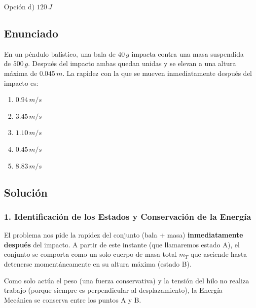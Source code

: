 \documentclass[12pt, a4paper]{article}
\begin{document}
\begin{tcolorbox}[colback=green!5!white, colframe=green!50!black, title=Respuesta Final]
\centering Opción d) $120 \, \si{J}$
\end{tcolorbox}

\newpage

\subsection*{Enunciado}
En un péndulo balístico, una bala de $40 \, \si{g}$ impacta contra una masa suspendida de $500 \, \si{g}$. Después del impacto ambas quedan unidas y se elevan a una altura máxima de $0.045 \, \si{m}$. La rapidez con la que se mueven inmediatamente después del impacto es:
\begin{enumerate}[label=\alph*)]
    \item $0.94 \, \si{m/s}$
    \item $3.45 \, \si{m/s}$
    \item $1.10 \, \si{m/s}$
    \item $0.45 \, \si{m/s}$
    \item $8.83 \, \si{m/s}$
\end{enumerate}

\subsection*{Solución}

\subsubsection*{1. Identificación de los Estados y Conservación de la Energía}
El problema nos pide la rapidez del conjunto (bala + masa) \textbf{inmediatamente después} del impacto. A partir de este instante (que llamaremos estado A), el conjunto se comporta como un solo cuerpo de masa total $m_T$ que asciende hasta detenerse momentáneamente en su altura máxima (estado B).

Como solo actúa el peso (una fuerza conservativa) y la tensión del hilo no realiza trabajo (porque siempre es perpendicular al desplazamiento), la Energía Mecánica se conserva entre los puntos A y B.
\end{document}
